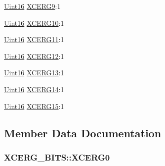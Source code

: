 \begin{DoxyCompactItemize}
\item 
\hyperlink{_d_s_p2833x___device_8h_a59a9f6be4562c327cbfb4f7e8e18f08b}{Uint16} \hyperlink{struct_x_c_e_r_g___b_i_t_s_a72f86f35b63523c803b483d8c8201f0b}{X\+C\+E\+R\+G9}\+:1
\item 
\hyperlink{_d_s_p2833x___device_8h_a59a9f6be4562c327cbfb4f7e8e18f08b}{Uint16} \hyperlink{struct_x_c_e_r_g___b_i_t_s_a7092a3a7ad93cf5fe5535ebf1effab8d}{X\+C\+E\+R\+G10}\+:1
\item 
\hyperlink{_d_s_p2833x___device_8h_a59a9f6be4562c327cbfb4f7e8e18f08b}{Uint16} \hyperlink{struct_x_c_e_r_g___b_i_t_s_ae6f3e4aeb3169c9264b10ea6f1840c62}{X\+C\+E\+R\+G11}\+:1
\item 
\hyperlink{_d_s_p2833x___device_8h_a59a9f6be4562c327cbfb4f7e8e18f08b}{Uint16} \hyperlink{struct_x_c_e_r_g___b_i_t_s_a2359f3522a8b36d7680a4516be275809}{X\+C\+E\+R\+G12}\+:1
\item 
\hyperlink{_d_s_p2833x___device_8h_a59a9f6be4562c327cbfb4f7e8e18f08b}{Uint16} \hyperlink{struct_x_c_e_r_g___b_i_t_s_a83102824f70f5e98a7bde33900810d9a}{X\+C\+E\+R\+G13}\+:1
\item 
\hyperlink{_d_s_p2833x___device_8h_a59a9f6be4562c327cbfb4f7e8e18f08b}{Uint16} \hyperlink{struct_x_c_e_r_g___b_i_t_s_a7d9b45eb8584b1dcb0b439c1db029608}{X\+C\+E\+R\+G14}\+:1
\item 
\hyperlink{_d_s_p2833x___device_8h_a59a9f6be4562c327cbfb4f7e8e18f08b}{Uint16} \hyperlink{struct_x_c_e_r_g___b_i_t_s_a1d1cc388059a56f475d19463f8e14930}{X\+C\+E\+R\+G15}\+:1
\end{DoxyCompactItemize}


\subsection{Member Data Documentation}
\hypertarget{struct_x_c_e_r_g___b_i_t_s_aefe12fb8bc6a588c492266edb7347733}{}
\subsubsection[{X\+C\+E\+R\+G0}]{ X\+C\+E\+R\+G\+\_\+\+B\+I\+T\+S\+::\+X\+C\+E\+R\+G0}\label{struct_x_c_e_r_g___b_i_t_s_aefe12fb8bc6a588c492266edb7347733}
\hypertarget{struct_x_c_e_r_g___b_i_t_s_a5eca45f72de9429f2b6a7039551b1aab}{}
